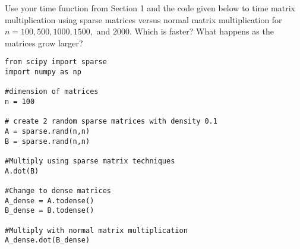 \begin{problem}
Use your time function from Section 1 and the code given below to time matrix multiplication using sparse matrices versus normal matrix multiplication for $ n = 100, 500, 1000, 1500,$ and $2000$. Which is faster? What happens as the matrices grow larger?
\begin{lstlisting}
from scipy import sparse
import numpy as np

#dimension of matrices
n = 100

# create 2 random sparse matrices with density 0.1
A = sparse.rand(n,n)
B = sparse.rand(n,n)

#Multiply using sparse matrix techniques
A.dot(B)

#Change to dense matrices
A_dense = A.todense()
B_dense = B.todense()

#Multiply with normal matrix multiplication
A_dense.dot(B_dense)

 \end{lstlisting}
 \label{prob:Sparse}
 \end{problem}

